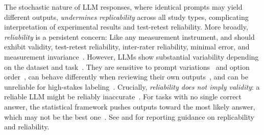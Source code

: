 The stochastic nature of LLM responses, where identical prompts may yield different outputs, \emph{undermines replicability} across all study types, complicating interpretation of experimental results and test-retest reliability. More broadly, \emph{reliability} is a persistent concern: Like any measurement instrument, \judges and \annotators should exhibit validity, test-retest reliability, inter-rater reliability, minimal error, and measurement invariance~\cite{DBLP:books/sp/24/RalphKAA24}. However, LLMs show substantial variability depending on the dataset and task~\cite{DBLP:journals/corr/abs-2306-00176, DBLP:journals/corr/abs-2406-18403}. They are sensitive to prompt variations~\cite{DBLP:journals/corr/abs-2304-11085} and option order~\cite{DBLP:conf/naacl/PezeshkpourH24}, can behave differently when reviewing their own outputs~\cite{DBLP:conf/nips/PanicksseryBF24}, and can be unreliable for high-stakes labeling~\cite{DBLP:conf/chi/Wang0RMM24}. Crucially, \emph{reliability does not imply validity}: a reliable LLM might be reliably inaccurate~\cite{DBLP:conf/coling/ZhouC024}. For tasks with no single correct answer, the statistical framework pushes outputs toward the most likely answer, which may not be the best one~\cite{DBLP:journals/corr/abs-2510-01171, DBLP:journals/corr/abs-2310-06452}. See \modelversion and \limitationsmitigations for reporting guidance on replicability and reliability.

